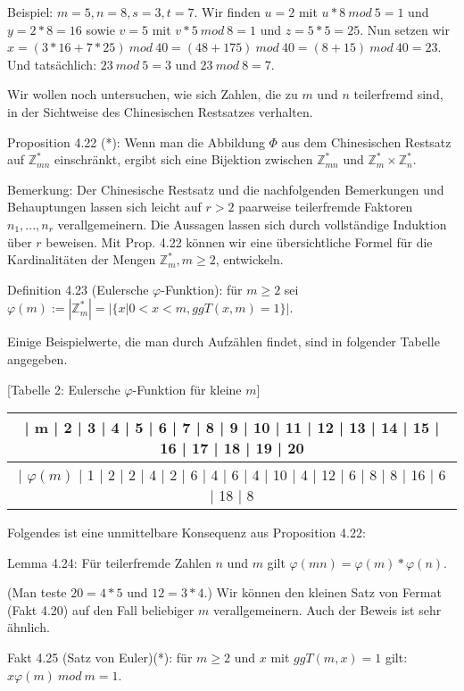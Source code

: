 \documentclass[a4paper]{article}
\begin{document}
\begin{multicols}{3}
    Beispiel: $m=5,n=8,s=3,t=7$. Wir finden $u=2$ mit $u*8\ mod\ 5 = 1$ und $y= 2*8=16$ sowie $v=5$ mit $v*5\ mod\ 8=1$ und $z=5*5=25$. Nun setzen wir $x=(3*16+7*25) \ mod\ 40=(48+175)\ mod\ 40 = (8 + 15)\ mod\ 40 = 23$. Und tatsächlich: $23\ mod\ 5 = 3$ und $23\ mod\ 8 = 7$.

    Wir wollen noch untersuchen, wie sich Zahlen, die zu $m$ und $n$ teilerfremd sind, in der Sichtweise des Chinesischen Restsatzes verhalten.

    Proposition 4.22 (*): Wenn man die Abbildung $\Phi$ aus dem Chinesischen Restsatz auf $\mathbb{Z}^*_{mn}$ einschränkt, ergibt sich eine Bijektion zwischen $\mathbb{Z}^*_{mn}$ und $\mathbb{Z}^*_m\times\mathbb{Z}^*_n$.

    Bemerkung: Der Chinesische Restsatz und die nachfolgenden Bemerkungen und Behauptungen lassen sich leicht auf $r>2$ paarweise teilerfremde Faktoren $n_1,...,n_r$
    verallgemeinern. Die Aussagen lassen sich durch vollständige Induktion über $r$ beweisen. Mit Prop. 4.22 können wir eine übersichtliche Formel für die Kardinalitäten der Mengen $\mathbb{Z}^*_m, m\geq 2$, entwickeln.

    Definition 4.23 (Eulersche $\varphi$-Funktion): für $m\geq 2$ sei $\varphi(m):=|\mathbb{Z}^*_m| =|\{x| 0<x<m,ggT(x,m) = 1\}|$.

    Einige Beispielwerte, die man durch Aufzählen findet, sind in folgender Tabelle angegeben.

        [Tabelle 2: Eulersche $\varphi$-Funktion für kleine $m$]
    \begin{tabular}{c}
        | m  | 2  | 3  | 4  | 5  | 6  | 7  | 8  | 9  | 10 | 11 | 12 | 13 | 14 | 15 | 16 | 17 | 18 | 19 | 20 \\\hline
        | $\varphi(m)$ | 1  | 2  | 2  | 4  | 2  | 6  | 4  | 6  | 4  | 10 | 4  | 12 | 6  | 8  | 8  | 16 | 6  | 18 | 8
    \end{tabular}

    Folgendes ist eine unmittelbare Konsequenz aus Proposition 4.22:

    Lemma 4.24: Für teilerfremde Zahlen $n$ und $m$ gilt $\varphi(mn)=\varphi(m)*\varphi(n)$.

    (Man teste $20=4*5$ und $12=3*4$.)
    Wir können den kleinen Satz von Fermat (Fakt 4.20) auf den Fall beliebiger $m$ verallgemeinern. Auch der Beweis ist sehr ähnlich.

    Fakt 4.25 (Satz von Euler)(*): für $m\geq 2$ und $x$ mit $ggT(m,x) = 1$ gilt: $x\varphi(m)\ mod\ m=1$.


\end{multicols}
\end{document}
